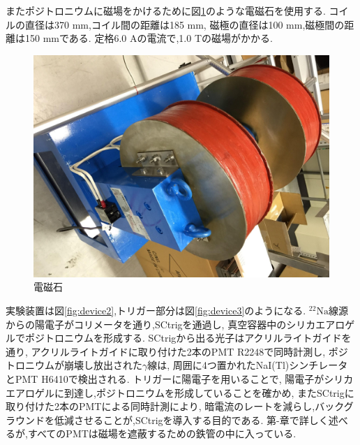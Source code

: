 またポジトロニウムに磁場をかけるために図\ref{fig:mag}のような電磁石を使用する.
コイルの直径は370 mm,コイル間の距離は185 mm,
磁極の直径は100 mm,磁極間の距離は150 mmである.
定格6.0 Aの電流で,1.0 Tの磁場がかかる.

\begin{figure}[H]
\centering
\includegraphics[keepaspectratio,angle=90,scale=0.4]{fig/ybm/mag.pdf}
\caption{電磁石}
\label{fig:mag}
\end{figure}

実験装置は図\ref{fig:device2},トリガー部分は図\ref{fig:device3}のようになる.
$\mathrm{^{22}Na}$線源からの陽電子がコリメータを通り,SCtrigを通過し,
真空容器中のシリカエアロゲルでポジトロニウムを形成する.
SCtrigから出る光子はアクリルライトガイドを通り,
アクリルライトガイドに取り付けた2本のPMT R2248で同時計測し,
ポジトロニウムが崩壊し放出された$\gamma$線は,
周囲に4つ置かれたNaI(Tl)シンチレータとPMT H6410で検出される.
トリガーに陽電子を用いることで,
陽電子がシリカエアロゲルに到達し,ポジトロニウムを形成していることを確かめ,
またSCtrigに取り付けた2本のPMTによる同時計測により,
暗電流のレートを減らし,バックグラウンドを低減させることが,SCtrigを導入する目的である.
第-章で詳しく述べるが,すべてのPMTは磁場を遮蔽するための鉄管の中に入っている.

